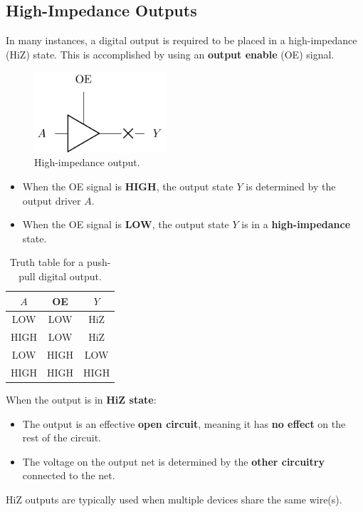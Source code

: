 \documentclass{report}
\begin{document}
\subsection{High-Impedance Outputs}
In many instances, a digital output is required to be placed in a high-impedance (HiZ) state.
This is accomplished by using an \textbf{output enable} (OE) signal.
\begin{figure}[H]
    \centering
    \includegraphics[height = 3cm, keepaspectratio = true]{figures/HiZ.pdf}
    \caption{High-impedance output.} %
\end{figure}
\begin{itemize}
    \item When the OE signal is \textbf{HIGH}, the output state \(Y\) is determined by the output driver \(A\).
    \item When the OE signal is \textbf{LOW}, the output state \(Y\) is in a \textbf{high-impedance} state.
\end{itemize}
\begin{table}[H]
    \centering
    \begin{tabular}{c c | c} %
        \toprule
        \textbf{\(A\)} & \textbf{OE} & \textbf{\(Y\)} \\
        \midrule
        LOW            & LOW         & HiZ            \\
        HIGH           & LOW         & HiZ            \\
        LOW            & HIGH        & LOW            \\
        HIGH           & HIGH        & HIGH           \\
        \bottomrule
    \end{tabular}
    \caption{Truth table for a push-pull digital output.} %
\end{table}
When the output is in \textbf{HiZ state}:
\begin{itemize}
    \item The output is an effective \textbf{open circuit}, meaning it has \textbf{no effect} on the rest of the circuit.
    \item The voltage on the output net is determined by the \textbf{other circuitry} connected to the net.
\end{itemize}
HiZ outputs are typically used when multiple devices share the same wire(s).
\end{document}
